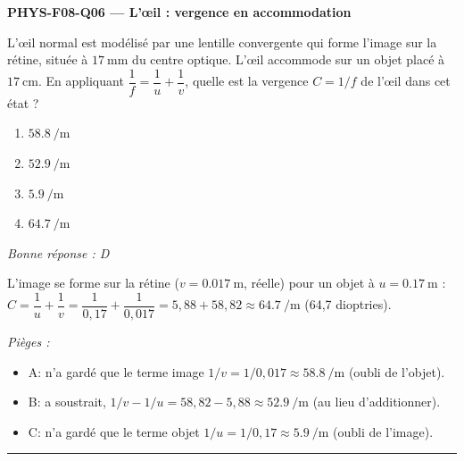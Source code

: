 \documentclass[11pt,a4paper]{article}
\begin{document}
\noindent\textbf{PHYS-F08-Q06 --- L'\oe il : vergence en accommodation}\par
L'\oe il normal est modélisé par une lentille convergente qui forme l'image sur la rétine, située à
$\qty{17}{\milli\metre}$ du centre optique. L'\oe il accommode sur un objet placé à $\qty{17}{\centi\metre}$.
En appliquant $\dfrac1f=\dfrac1u+\dfrac1v$, quelle est la vergence $C=1/f$ de l'\oe il dans cet état ?
\begin{enumerate}[label=\Alph*)]
\item $\qty{58.8}{\per\metre}$
\item $\qty{52.9}{\per\metre}$
\item $\qty{5.9}{\per\metre}$
\item $\qty{64.7}{\per\metre}$
\end{enumerate}
\textit{Bonne réponse : D}\par
L'image se forme sur la rétine ($v=\qty{0.017}{\metre}$, réelle) pour un objet à $u=\qty{0.17}{\metre}$ :
$C=\dfrac{1}{u}+\dfrac{1}{v}=\dfrac{1}{0{,}17}+\dfrac{1}{0{,}017}=5{,}88+58{,}82\approx\qty{64.7}{\per\metre}$
(64,7 dioptries).\par
\textit{Pièges :}
\begin{itemize}
\item A: n'a gardé que le terme image $1/v=1/0{,}017\approx\qty{58.8}{\per\metre}$ (oubli de l'objet).
\item B: a soustrait, $1/v-1/u=58{,}82-5{,}88\approx\qty{52.9}{\per\metre}$ (au lieu d'additionner).
\item C: n'a gardé que le terme objet $1/u=1/0{,}17\approx\qty{5.9}{\per\metre}$ (oubli de l'image).
\end{itemize}
\vspace{8pt}\hrule\vspace{8pt}
\end{document}

